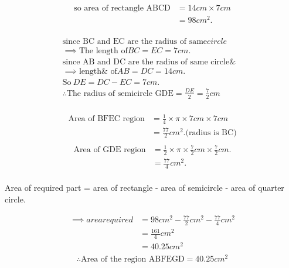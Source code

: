 \documentclass[journal,11pt,a4paper]{article}
\begin{document}
\begin{multicols}{2}
\begin{center}
 \begin{align*}
    \text{so area of rectangle ABCD}&= 14cm\times 7cm\\
                 &= 98cm^2.\\
  \end{align*}
\end{center}
\columnbreak
  \begin{center}
  \begin{align*}
        \text{since BC and EC are the radius of same} circle&\\
    \implies \text{The length of} BC = EC = 7cm.&\\
        \text{since AB and DC are the radius of same circle&}\\
    \implies \text{length& of}AB = DC = 14cm.& \\ 
                     \text{So}\ DE=DC-EC =7cm.& \\ 
\therefore \text{The radius of semicircle GDE} =\frac{DE}{2}=\frac{7}{2}cm&\\
 \end{align*}
    \end{center}
    \vspace{-15pt}
\begin{align*}
\text{Area of BFEC region} &= \frac{1}{4} \times \pi \times 7cm \times 7cm\\ 
               &= \frac{77}{2}cm^2.\text{(radius is BC)}\\
\end{align*}
\vspace{-15pt}
\begin{align*}
\text{Area of GDE region} &=\frac{1}{2} \times \pi \times \frac{7}{2}cm \times \frac{7}{2}cm.\\
                          &= \frac{77}{4}cm^2.\\
\end{align*}
      \vspace{-15pt}
  \begin{flushleft}
Area of required part = area of rectangle - area of semicircle - area of quarter circle.\\
   \end{flushleft}
   \vspace{-15pt}
   \begin{align*}
\implies area required &=98cm^{2} - \frac{77}{2}cm^{2} - \frac{77}{4}cm^{2}\\ 
&= \frac{161}{4}cm^{2} \\
&= 40.25cm^{2}  \\
    \end{align*}
    \vspace{-15pt}
$$ \therefore \text{Area of the region ABFEGD} = 40.25cm^2 $$  
\end{multicols}
\pagebreak
\end{document}
